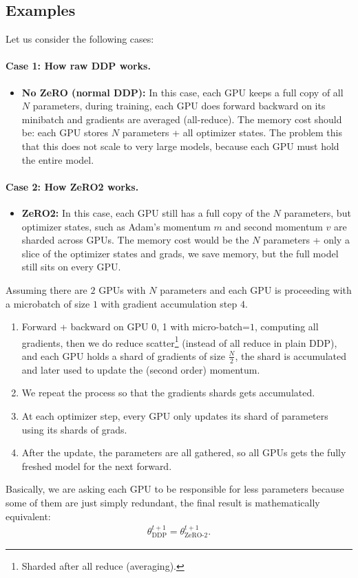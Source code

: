 \documentclass[11pt]{article}  %
\begin{document}
\subsection{Examples}
Let us consider the following cases:

\paragraph{Case 1: How raw DDP works.}
\begin{itemize}
  \item \textbf{No ZeRO (normal DDP):} In this case, each GPU keeps a full copy of all $N$ parameters, during training, each GPU does forward backward on its minibatch and gradients are averaged (all-reduce).
  The memory cost should be: each GPU stores $N$ parameters + all optimizer states.
  The problem this that this does not scale to very large models, because each GPU must hold the entire model.
\end{itemize}

\paragraph{Case 2: How ZeRO2 works.}
\begin{itemize}
  \item \textbf{ZeRO2:} In this case, each GPU still has a full copy of the $N$ parameters, but optimizer states, such as Adam's momentum $m$ and second momentum $v$ are sharded across GPUs.
  The memory cost would be the $N$ parameters + only a slice of the optimizer states and grads, we save memory, but the full model still sits on every GPU.
\end{itemize}
Assuming there are $2$ GPUs with $N$ parameters and each GPU is proceeding with a microbatch of size $1$ with gradient accumulation step $4$.
\begin{enumerate}
  \item Forward + backward on GPU 0, 1 with micro-batch=$1$, computing all gradients, then we do reduce scatter\footnote{Sharded after all reduce (averaging).} (instead of all reduce in plain DDP), and each GPU holds a shard of gradients of size $\frac{N}{2}$, the shard is accumulated and later used to update the (second order) momentum.
  
  \item We repeat the process so that the gradients shards gets accumulated.
  
  \item At each optimizer step, every GPU only updates its shard of parameters using its shards of grads.
  
  \item After the update, the parameters are all gathered, so all GPUs gets the fully freshed model for the next forward.
\end{enumerate} 
Basically, we are asking each GPU to be responsible for less parameters because some of them are just simply redundant, the final result is mathematically equivalent:
\begin{align}
  \theta_{\text{DDP}}^{t+1} = \theta^{t+1}_{\text{ZeRO-}2}.
\end{align}
\end{document}
